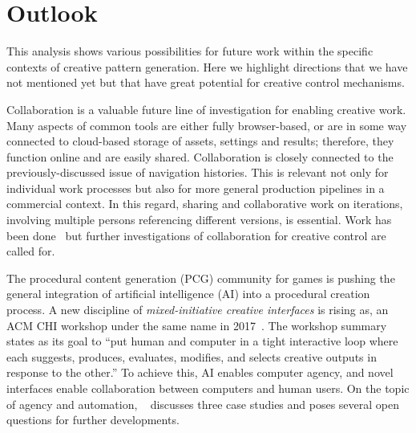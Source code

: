 
\section{Outlook}
\label{sec:outlook}

This analysis shows various possibilities for future work within the specific contexts of creative pattern generation. 
%
Here we highlight directions that we have not mentioned yet but that have great potential for creative control mechanisms.

Collaboration is a valuable future line of investigation for enabling creative work. Many aspects of common tools are either fully browser-based, or are in some way connected to cloud-based storage of assets, settings and results; therefore, they function online and are easily shared. Collaboration is closely connected to the previously-discussed issue of navigation histories. This is relevant not only for individual work processes but also for more general production pipelines in a commercial context. In this regard, sharing and collaborative work on iterations, involving multiple persons referencing different versions, is essential. Work has been done~\cite{talton_2009_emw, salvati_2015_mcm,oleary_2018_csi} but further investigations of collaboration for creative control are called for. 

The procedural content generation (PCG) community for games is pushing the general integration of artificial intelligence (AI) into a procedural creation process. A new discipline of \textit{mixed-initiative creative interfaces} is rising as, \eg an ACM CHI workshop under the same name in 2017~\cite{deterding_2017_mci}. The workshop summary states as its goal to ``put human and computer in a tight interactive loop where each suggests, produces, evaluates, modifies, and selects creative outputs in response to the other.'' To achieve this, AI enables computer agency, and novel interfaces enable collaboration between computers and human users. On the topic of agency and automation,  \citeauthor*{heer_2019_apa}~\cite{heer_2019_apa} discusses three case studies and poses several open questions for further developments.

